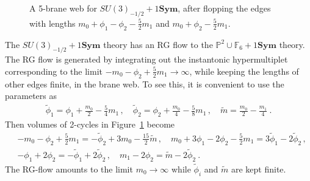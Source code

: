 \begin{figure}
	\centering
	\caption{A 5-brane web for $ SU(3)_{-1/2} + 1\mathbf{Sym} $, after flopping the edges with lengths $ m_0 + \phi_1 - \phi_2 - \frac{5}{2}m_1 $ and $ m_0 + \phi_2 -\frac{5}{2}m_1 $.} \label{fig:P2-F6-Sym}
\end{figure}

The $ SU(3)_{-1/2} + 1\mathbf{Sym} $ theory has an RG flow to the $ \mathbb{P}^2 \cup \mathbb{F}_6 + 1\mathbf{Sym} $ theory. The RG flow is generated by integrating out the instantonic hypermultiplet corresponding to the limit $ -m_0 - \phi_2 + \frac{5}{2}m_1 \to \infty $, while keeping the lengths of other edges finite, in the brane web. To see this, it is convenient to use the parameters as
\begin{align}\label{eq:P2-F6-var-redef}
\tilde{\phi}_1 = \phi_1 + \frac{m_0}{2} - \frac{5}{4}m_1 \, , \quad
\tilde{\phi}_2 = \phi_2 + \frac{m_0}{4} - \frac{5}{8}m_1 \, , \quad
\tilde{m} = \frac{m_0}{2} - \frac{m_1}{4} \ .
\end{align}
Then volumes of 2-cycles in Figure~\ref{fig:P2-F6-Sym} become
\begin{align}
&-m_0 - \phi_2 + \frac{5}{2}m_1 = -\tilde{\phi}_2 + 3m_0 - \frac{15}{2}\tilde{m} \, , \quad
m_0 + 3\phi_1 - 2\phi_2 - \frac{5}{2}m_1 = 3\tilde{\phi}_1 - 2\tilde{\phi}_2 \, , \nonumber \\
&-\phi_1 + 2\phi_2 = -\tilde{\phi}_1 + 2\tilde{\phi}_2 \, , \quad
m_1 - 2\phi_2 = \tilde{m} - 2\tilde{\phi}_2 \ .
\end{align}
The RG-flow amounts to the limit $ m_0 \to \infty $ while $ \tilde{\phi}_i $ and $ \tilde{m} $ are kept finite.

